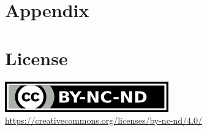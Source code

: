 \documentclass[sigconf, screen]{acmart}
\begin{document}
\section{Appendix}
\label{s:appendix}


\section*{License}
\label{s:license}
\begin{center}
	\includegraphics{by-nc-nd.png} \\
	\url{https://creativecommons.org/licenses/by-nc-nd/4.0/}
\end{center}
\end{document}
